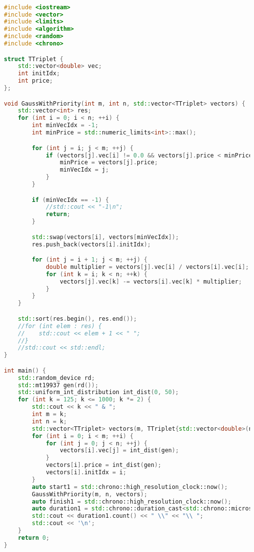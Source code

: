 \documentclass[12pt]{article}
\begin{document}
\begin{lstlisting}[language=C++]

#include <iostream>
#include <vector>
#include <limits>
#include <algorithm>
#include <random>
#include <chrono>

struct TTriplet {
    std::vector<double> vec;
    int initIdx;
    int price;
};

void GaussWithPriority(int m, int n, std::vector<TTriplet> vectors) {
    std::vector<int> res;
    for (int i = 0; i < n; ++i) {
        int minVecIdx = -1;
        int minPrice = std::numeric_limits<int>::max();

        for (int j = i; j < m; ++j) {
            if (vectors[j].vec[i] != 0.0 && vectors[j].price < minPrice) {
                minPrice = vectors[j].price;
                minVecIdx = j;
            }
        }

        if (minVecIdx == -1) {
            //std::cout << "-1\n";
            return;
        }

        std::swap(vectors[i], vectors[minVecIdx]);
        res.push_back(vectors[i].initIdx);

        for (int j = i + 1; j < m; ++j) {
            double multiplier = vectors[j].vec[i] / vectors[i].vec[i];
            for (int k = i; k < n; ++k) {
                vectors[j].vec[k] -= vectors[i].vec[k] * multiplier;
            }
        }
    }

    std::sort(res.begin(), res.end());
    //for (int elem : res) {
    //    std::cout << elem + 1 << " ";
    //}
    //std::cout << std::endl;
}

int main() {
    std::random_device rd;
    std::mt19937 gen(rd());
    std::uniform_int_distribution int_dist(0, 50);
    for (int k = 125; k <= 1000; k *= 2) {
        std::cout << k << " & ";
        int m = k;
        int n = k;
        std::vector<TTriplet> vectors(m, TTriplet{std::vector<double>(n), 0, 0});
        for (int i = 0; i < m; ++i) {
            for (int j = 0; j < n; ++j) {
                vectors[i].vec[j] = int_dist(gen);
            }
            vectors[i].price = int_dist(gen);
            vectors[i].initIdx = i;
        }
        auto start1 = std::chrono::high_resolution_clock::now();
        GaussWithPriority(m, n, vectors);
        auto finish1 = std::chrono::high_resolution_clock::now();
        auto duration1 = std::chrono::duration_cast<std::chrono::microseconds>(finish1 - start1);
        std::cout << duration1.count() << " \\" << "\\ ";
        std::cout << '\n';
    }
    return 0;
}


\end{lstlisting}
\end{document}
